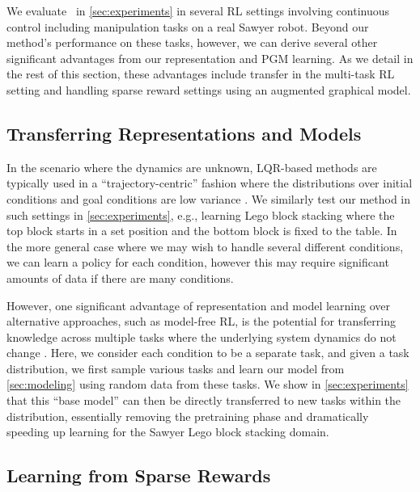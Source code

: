 We evaluate \metabbr\ in \autoref{sec:experiments} in several RL settings involving continuous control including manipulation tasks on a real Sawyer robot. Beyond our method's performance on these tasks, however, we can derive several other significant advantages from our representation and PGM learning. As we detail in the rest of this section, these advantages include transfer in the multi-task RL setting and handling sparse reward settings using an augmented graphical model.

\subsection{Transferring Representations and Models}
\label{sec:transfer}

In the scenario where the dynamics are unknown, LQR-based methods are typically used in a ``trajectory-centric'' fashion where the distributions over initial conditions and goal conditions are low variance \citep{mfcgps,pilqr}. We similarly test our method in such settings in \autoref{sec:experiments}, e.g., learning Lego block stacking where the top block starts in a set position and the bottom block is fixed to the table. In the more general case where we may wish to handle several different conditions, we can learn a policy for each condition, however this may require significant amounts of data if there are many conditions.

However, one significant advantage of representation and model learning over alternative approaches, such as model-free RL, is the potential for transferring knowledge across multiple tasks where the underlying system dynamics do not change \citep{srl-survey}. Here, we consider each condition to be a separate task, and given a task distribution, we first sample various tasks and learn our model from \autoref{sec:modeling} using random data from these tasks. We show in \autoref{sec:experiments} that this ``base model'' can then be directly transferred to new tasks within the distribution, essentially removing the pretraining phase and dramatically speeding up learning for the Sawyer Lego block stacking domain.

\subsection{Learning from Sparse Rewards}
\label{sec:sparse}


